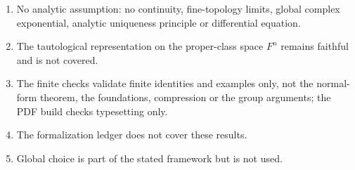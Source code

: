 \documentclass[11pt,oneside]{article}
\numberwithin{equation}{section}
\theoremstyle{definition}
\theoremstyle{remark}
\begin{document}
\begin{enumerate}[leftmargin=*,widest=00,label=07.\arabic*]
foundational setting, not externally described maps in a larger metatheory.
\item No analytic assumption: no continuity, fine-topology limits, global complex
exponential, analytic uniqueness principle or differential equation.
\item The tautological representation on the proper-class space $F^n$ remains
faithful and is not covered.
\item The finite checks validate finite identities and examples only, not the
normal-form theorem, the foundations, compression or the group arguments; the PDF
build checks typesetting only.
\item The formalization ledger does not cover these results.
\item Global choice is part of the stated framework but is not used.
\end{enumerate}
\end{document}

